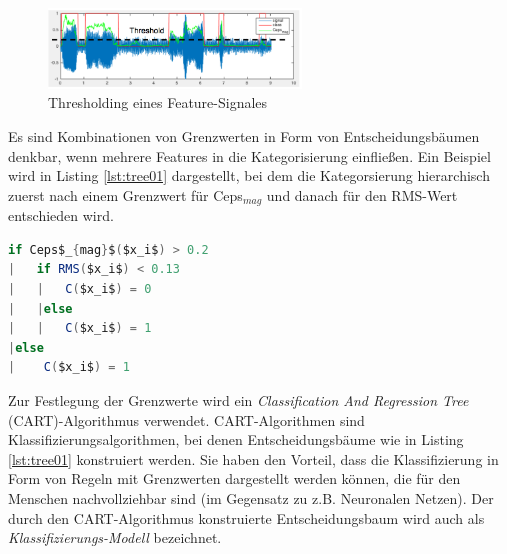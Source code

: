 \begin{figure}[h]
	\centering
	\includegraphics[width=0.6\textwidth]{bilder/thresholded.png}
	\caption{Thresholding eines Feature-Signales}
	\label{img:thresholded}
\end{figure}

Es sind  Kombinationen von Grenzwerten in Form von Entscheidungsbäumen denkbar, wenn mehrere Features in die Kategorisierung einfließen. Ein Beispiel wird in Listing \ref{lst:tree01} dargestellt, bei dem die Kategorsierung hierarchisch zuerst nach einem Grenzwert für Ceps$_{mag}$ und danach für den RMS-Wert entschieden wird.


\begin{lstlisting}[frame=single,mathescape=true,basicstyle=\footnotesize,language=Java,label=lst:tree01,caption=Beispiel eines CART-Entscheidungsbaums,linewidth=1\textwidth]
if Ceps$_{mag}$($x_i$) > 0.2
|   if RMS($x_i$) < 0.13
|   |   C($x_i$) = 0
|   |else
|   |   C($x_i$) = 1
|else
|    C($x_i$) = 1
\end{lstlisting}


Zur Festlegung der Grenzwerte wird ein \emph{Classification And Regression Tree} (CART)-Algorithmus verwendet. CART-Algorithmen sind Klassifizierungsalgorithmen, bei denen Entscheidungsbäume wie in Listing \ref{lst:tree01} konstruiert werden. Sie haben den Vorteil, dass die Klassifizierung in Form von Regeln mit Grenzwerten dargestellt werden können, die für den Menschen nachvollziehbar sind (im Gegensatz zu z.B. Neuronalen Netzen). Der durch den CART-Algorithmus konstruierte Entscheidungsbaum wird auch als \emph{Klassifizierungs-Modell} bezeichnet.\cite{id3}

